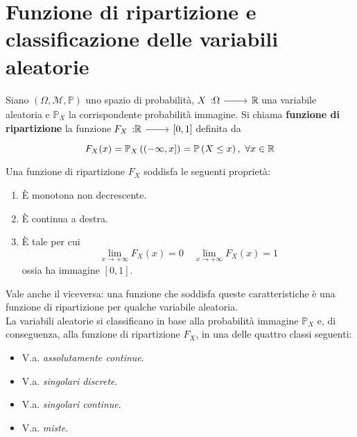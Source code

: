 \section{Funzione di ripartizione e classificazione delle variabili aleatorie}
\begin{define}
	Siano $\left(\Omega,\mathcal{M},\mathbb{P}\right)$ uno spazio di probabilità, $\funz{X}{\Omega}{\realset}$ una variabile aleatoria e $\mathbb{P}_X$ la corrispondente probabilità immagine. Si chiama \textbf{funzione di ripartizione} la funzione $\funz{F_X}{\realset}{\left[0,1\right]}$ definita da
	\begin{equation}
		F_X(x)=\mathbb{P}_X\left(\left(-\infty,x\right]\right)=\mathbb{P}\left(X\leq x\right),\ \forall x\in\mathbb{R}
	\end{equation}
\end{define}
Una funzione di ripartizione $F_X$ soddisfa le seguenti proprietà:
\begin{enumerate}
	\item È monotona non decrescente.
	\item È continua a destra.
	\item È tale per cui
	\begin{equation}
		\lim_{x\to+\infty}F_X(x)=0\quad\lim_{x\to+\infty}F_X(x)=1
	\end{equation}
	ossia ha immagine $\left[0,1\right]$.
\end{enumerate}
Vale anche il viceversa: una funzione che soddisfa queste caratteristiche è una funzione di ripartizione per qualche variabile aleatoria.\\
La variabili aleatorie si classificano in base alla probabilità immagine $\mathbb{P}_X$ e, di conseguenza, alla funzione di ripartizione $F_X$, in una delle quattro classi seguenti:
\begin{itemize}
	\item V.a. \textit{assolutamente continue}.
	\item V.a. \textit{singolari discrete}.
	\item V.a. \textit{singolari continue}.
	\item V.a. \textit{miste}.
\end{itemize}
